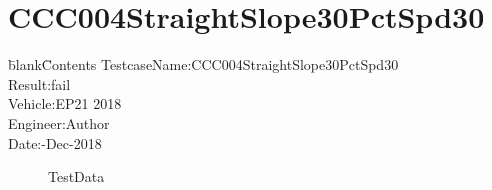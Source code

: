 \documentclass[12pt]{report}
\begin{document}
\section{CCC004StraightSlope30PctSpd30} 
\begin{CJK}{GBK}{kai} 
\begin{tabbing} 
\hspace*{40bp}\=blank\hspace*{80bp}\=Contents\kill 
 \>TestcaseName:\>CCC004StraightSlope30PctSpd30\\ 
 \>Result:\>fail\\ 
 \>Vehicle:\>EP21 2018\\ 
 \>Engineer:\>Author\\ 
 \>Date:-Dec-2018\\ 
\end{tabbing} 
\end{CJK} 
\label{w4} 
\begin{figure}[h!]  
\centering  
{} 
 
\caption{TestData} 
\end{figure} 
\end{document}
